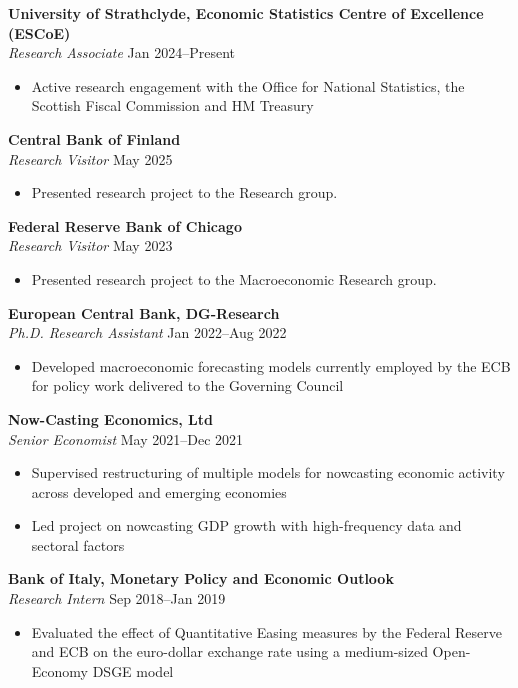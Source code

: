 \documentclass[11pt,a4paper]{article}
\begin{document}
\noindent\textbf{University of Strathclyde, Economic Statistics Centre of Excellence (ESCoE)}\\
\textit{Research Associate} \hfill Jan 2024--Present
\begin{itemize}[leftmargin=0.5cm, itemsep=0pt]
    \item Active research engagement with the Office for National Statistics, the Scottish Fiscal Commission and HM Treasury
\end{itemize}

\noindent\textbf{Central Bank of Finland}\\
\textit{Research Visitor} \hfill May 2025
\begin{itemize}[leftmargin=0.5cm, itemsep=0pt]
    \item Presented research project to the Research group.
\end{itemize}

\noindent\textbf{Federal Reserve Bank of Chicago}\\
\textit{Research Visitor} \hfill May 2023
\begin{itemize}[leftmargin=0.5cm, itemsep=0pt]
    \item Presented research project to the Macroeconomic Research group.
\end{itemize}

\noindent\textbf{European Central Bank, DG-Research}\\
\textit{Ph.D. Research Assistant} \hfill Jan 2022--Aug 2022
\begin{itemize}[leftmargin=0.5cm, itemsep=0pt]
    \item Developed macroeconomic forecasting models currently employed by the ECB for policy work delivered to the Governing Council
\end{itemize}

\noindent\textbf{Now-Casting Economics, Ltd}\\
\textit{Senior Economist} \hfill May 2021--Dec 2021
\begin{itemize}[leftmargin=0.5cm, itemsep=0pt]
    \item Supervised restructuring of multiple models for nowcasting economic activity across developed and emerging economies
    \item Led project on nowcasting GDP growth with high-frequency data and sectoral factors
\end{itemize}

\noindent\textbf{Bank of Italy, Monetary Policy and Economic Outlook}\\
\textit{Research Intern} \hfill Sep 2018--Jan 2019
\begin{itemize}[leftmargin=0.5cm, itemsep=0pt]
    \item Evaluated the effect of Quantitative Easing measures by the Federal Reserve and ECB on the euro-dollar exchange rate using a medium-sized Open-Economy DSGE model
\end{itemize}
\end{document}
